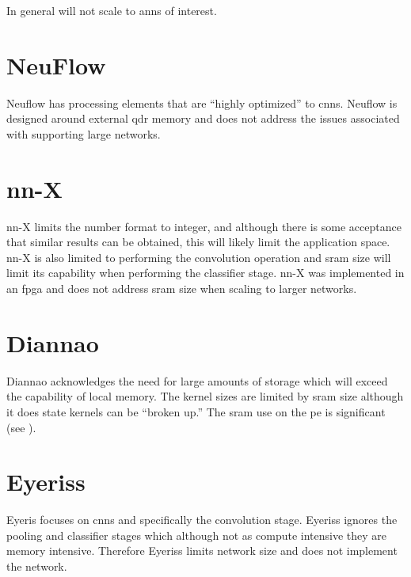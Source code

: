 {{{{In general will not scale to \acp{ann} of interest.


\section{NeuFlow \cite{farabet2011neuflow}}
Neuflow\cite{farabet2011neuflow} has processing elements that are ``highly optimized'' to \acp{cnn}.
Neuflow is designed around external \ac{qdr} memory and does not address the issues associated with supporting large networks.


\section[nn-X]{nn-X \cite{gokhale2014240}}
nn-X\cite{gokhale2014240} limits the number format to integer, and although there is some acceptance that similar
results can be obtained, this will likely limit the application space. nn-X is also limited to performing the convolution operation
and \ac{sram} size will limit its capability when performing the classifier stage.
nn-X was implemented in an fpga and does not address \ac{sram} size when scaling to larger networks.


\section[Diannao]{Diannao \cite{chen2014diannao}}
Diannao\cite{chen2014diannao} acknowledges the need for large amounts of storage which will exceed the capability of local memory.
The kernel sizes are limited by \ac{sram} size although it does state kernels can be ``broken up.''
The \ac{sram} use on the \ac{pe} is significant (see ).


\section[Eyeriss]{Eyeriss \cite{chen201614}}
Eyeris\cite{chen201614} focuses on \acp{cnn} and specifically the convolution stage.
Eyeriss ignores the pooling and classifier stages which although not as compute intensive they are memory intensive.
Therefore Eyeriss limits network size and does not implement the network.

}}}}
